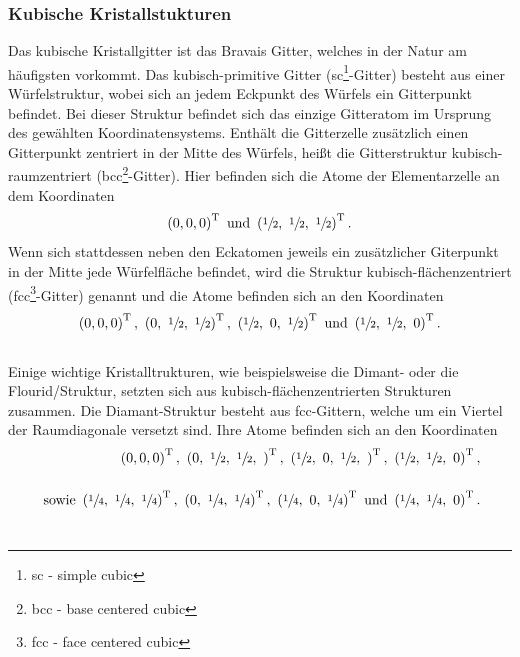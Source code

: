 \subsubsection{Kubische Kristallstukturen}
\label{sec:kubisch}
Das kubische Kristallgitter ist das Bravais Gitter, welches in der Natur am häufigsten vorkommt.
Das kubisch-primitive Gitter (sc\footnote{sc - simple cubic}-Gitter) besteht aus einer Würfelstruktur, wobei sich an jedem Eckpunkt des Würfels ein Gitterpunkt befindet.
Bei dieser Struktur befindet sich das einzige Gitteratom im Ursprung des gewählten Koordinatensystems.
Enthält die Gitterzelle  zusätzlich einen Gitterpunkt zentriert in der Mitte des Würfels, heißt die Gitterstruktur kubisch-raumzentriert (bcc\footnote{bcc - base centered cubic}-Gitter).
Hier befinden sich die Atome der Elementarzelle an dem Koordinaten
\begin{equation}
  \left(0,0,0\right)^\text{T}~\text{und}~  \left(\sfrac{1}{2},~\sfrac{1}{2},~\sfrac{1}{2}\right)^\text{T}.
\end{equation}
Wenn sich stattdessen neben den Eckatomen jeweils ein zusätzlicher Giterpunkt in der Mitte jede Würfelfläche befindet, wird die Struktur kubisch-flächenzentriert (fcc\footnote{fcc - face centered cubic}-Gitter) genannt und die Atome befinden sich an den Koordinaten
\begin{equation}
  \left(0,0,0\right)^\text{T},~  \left(0,~\sfrac{1}{2},~\sfrac{1}{2}\right)^\text{T},~  \left(\sfrac{1}{2},~0,~\sfrac{1}{2}\right)^\text{T}~\text{und}~  \left(\sfrac{1}{2},~\sfrac{1}{2},~0\right)^\text{T}.
\end{equation}\\
Einige wichtige Kristalltrukturen, wie beispielsweise die Dimant- oder die Flourid\-/Struktur, setzten sich aus kubisch-flächenzentrierten Strukturen zusammen.
Die Diamant-Struktur besteht aus fcc-Gittern, welche um ein Viertel der Raumdiagonale versetzt sind.
Ihre Atome befinden sich an den Koordinaten
\begin{align}
  \left(0,0,0\right)^\text{T},~  \left(0,~\sfrac{1}{2},~\sfrac{1}{2},~\right)^\text{T},~  \left(\sfrac{1}{2},~0,~\sfrac{1}{2},~\right)^\text{T},~  \left(\sfrac{1}{2},~\sfrac{1}{2},~0\right)^\text{T},\\~\\ ~\text{sowie}~ \left(\sfrac{1}{4},~\sfrac{1}{4},~\sfrac{1}{4}\right)^\text{T},~  \left(0,~\sfrac{1}{4},~\sfrac{1}{4}\right)^\text{T},~  \left(\sfrac{1}{4},~0,~\sfrac{1}{4}\right)^\text{T}~\text{und}~\left(\sfrac{1}{4},~\sfrac{1}{4},~0\right)^\text{T}.
\end{align}\\
